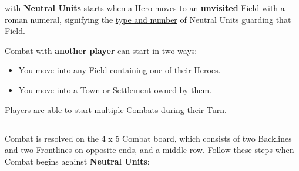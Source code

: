 
\begin{multicols}{2}

 with \textbf{Neutral Units} starts when a Hero moves to an \textbf{unvisited} Field with a roman numeral, signifying the \hyperlink{Difficulty Table}{type and number} of Neutral Units guarding that Field.

Combat with \textbf{another player} can start in two ways:
\begin{itemize}
  \item You move into any Field containing one of their Heroes.
  \item You move into a Town or Settlement owned by them.
\end{itemize}
Players are able to start multiple Combats during their Turn.

\subsection*{}

Combat is resolved on the 4 x 5 Combat board, which consists of two Backlines and two Frontlines on opposite ends, and a middle row.
Follow these steps when Combat begins against \textbf{Neutral Units}:


\end{multicols}
